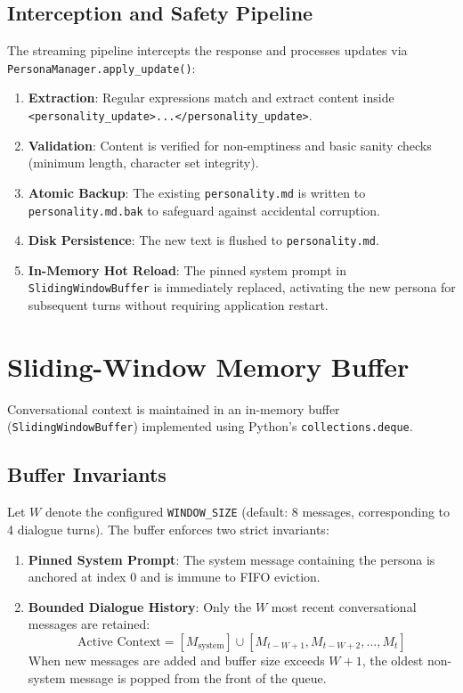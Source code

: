 \subsection{Interception and Safety Pipeline}
The streaming pipeline intercepts the response and processes updates via \texttt{PersonaManager.apply\_update()}:
\begin{enumerate}
    \item \textbf{Extraction}: Regular expressions match and extract content inside \texttt{<personality\_update>...</personality\_update>}.
    \item \textbf{Validation}: Content is verified for non-emptiness and basic sanity checks (minimum length, character set integrity).
    \item \textbf{Atomic Backup}: The existing \texttt{personality.md} is written to \texttt{personality.md.bak} to safeguard against accidental corruption.
    \item \textbf{Disk Persistence}: The new text is flushed to \texttt{personality.md}.
    \item \textbf{In-Memory Hot Reload}: The pinned system prompt in \texttt{SlidingWindowBuffer} is immediately replaced, activating the new persona for subsequent turns without requiring application restart.
\end{enumerate}

\section{Sliding-Window Memory Buffer}
Conversational context is maintained in an in-memory buffer (\texttt{SlidingWindowBuffer}) implemented using Python's \texttt{collections.deque}.

\subsection{Buffer Invariants}
Let $W$ denote the configured \texttt{WINDOW\_SIZE} (default: 8 messages, corresponding to 4 dialogue turns). The buffer enforces two strict invariants:
\begin{enumerate}
    \item \textbf{Pinned System Prompt}: The system message containing the persona is anchored at index 0 and is immune to FIFO eviction.
    \item \textbf{Bounded Dialogue History}: Only the $W$ most recent conversational messages are retained:
    \begin{equation}
        \text{Active Context} = [M_{\text{system}}] \cup [M_{t-W+1}, M_{t-W+2}, \dots, M_t]
    \end{equation}
    When new messages are added and buffer size exceeds $W + 1$, the oldest non-system message is popped from the front of the queue.
\end{enumerate}

